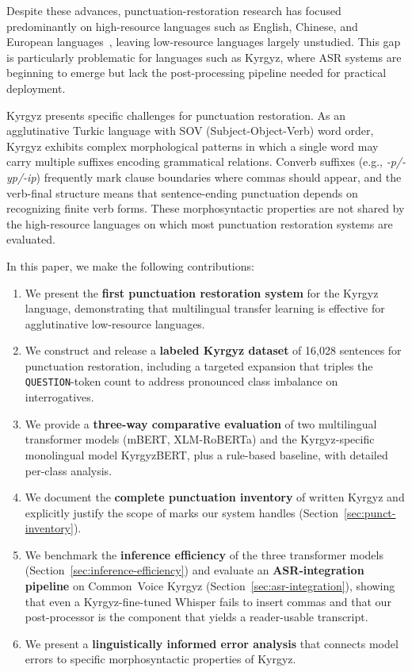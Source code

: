 \documentclass[manuscript, review]{acmart}
\begin{document}
Despite these advances, punctuation-restoration research has focused predominantly on high-resource languages such as English, Chinese, and European languages~\cite{alam2020punctuation, guerreiro2021subtitles, nagy2021punctuation}, leaving low-resource languages largely unstudied. This gap is particularly problematic for languages such as Kyrgyz, where ASR systems are beginning to emerge but lack the post-processing pipeline needed for practical deployment.

Kyrgyz presents specific challenges for punctuation restoration. As an agglutinative Turkic language with SOV (Subject-Object-Verb) word order, Kyrgyz exhibits complex morphological patterns in which a single word may carry multiple suffixes encoding grammatical relations. Converb suffixes (e.g., \textit{-p/-yp/-ip}) frequently mark clause boundaries where commas should appear, and the verb-final structure means that sentence-ending punctuation depends on recognizing finite verb forms. These morphosyntactic properties are not shared by the high-resource languages on which most punctuation restoration systems are evaluated.

In this paper, we make the following contributions:
\begin{enumerate}
    \item We present the \textbf{first punctuation restoration system} for the Kyrgyz language, demonstrating that multilingual transfer learning is effective for agglutinative low-resource languages.
    \item We construct and release a \textbf{labeled Kyrgyz dataset} of 16{,}028 sentences for punctuation restoration, including a targeted expansion that triples the \texttt{QUESTION}-token count to address pronounced class imbalance on interrogatives.
    \item We provide a \textbf{three-way comparative evaluation} of two multilingual transformer models (mBERT, XLM-RoBERTa) and the Kyrgyz-specific monolingual model KyrgyzBERT, plus a rule-based baseline, with detailed per-class analysis.
    \item We document the \textbf{complete punctuation inventory} of written Kyrgyz and explicitly justify the scope of marks our system handles (Section~\ref{sec:punct-inventory}).
    \item We benchmark the \textbf{inference efficiency} of the three transformer models (Section~\ref{sec:inference-efficiency}) and evaluate an \textbf{ASR-integration pipeline} on Common~Voice Kyrgyz (Section~\ref{sec:asr-integration}), showing that even a Kyrgyz-fine-tuned Whisper fails to insert commas and that our post-processor is the component that yields a reader-usable transcript.
    \item We present a \textbf{linguistically informed error analysis} that connects model errors to specific morphosyntactic properties of Kyrgyz.
\end{enumerate}
\end{document}

